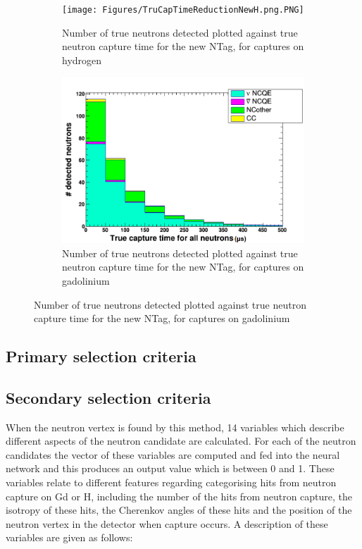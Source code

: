 \begin{figure}
    \centering
     \begin{subfigure}[b]{0.45\linewidth}
      \texttt{[image: Figures/TruCapTimeReductionNewH.png.PNG]}
      \caption{Number of true neutrons detected plotted against true neutron capture time for the new NTag, for captures on hydrogen}
      \label{fig:TrueCapTimeReductionNewH} 
     \end{subfigure}
     \begin{subfigure}[b]{0.45\linewidth}
       \includegraphics[width=\linewidth]{Figures/TruCapTimeReductionNewGd.PNG}
        \caption{Number of true neutrons detected plotted against true neutron capture time for the new NTag, for captures on gadolinium} 
     \label{fig:TrueCapTimeReductionNewGd}
      \end{subfigure} 
\end{figure}


\subsection{Primary selection criteria}
\subsection{Secondary selection criteria}
When the neutron vertex is found by this method, 14 variables which describe different aspects of the neutron candidate are calculated. For each of the neutron candidates the vector of these variables are computed and fed into the neural network and this produces an output value which is between 0 and 1. These variables relate to different features regarding categorising hits from neutron capture on Gd or H, including the number of the hits from neutron capture, the isotropy of these hits, the Cherenkov angles of these hits and the position of the neutron vertex in the detector when capture occurs. A description of these variables are given as follows:


